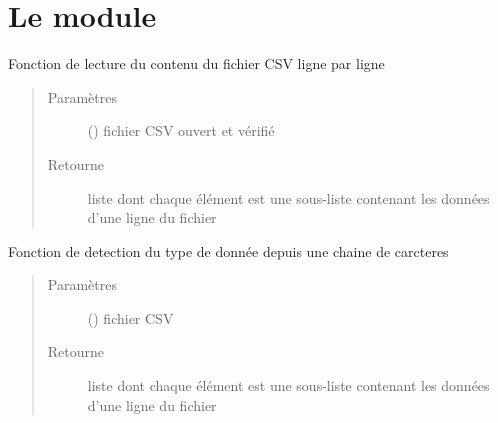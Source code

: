 \documentclass[letterpaper,10pt,french]{sphinxmanual}
\begin{document}
\section{Le module }
\label{\detokenize{analyseContenuFichier:le-module-analyse-contenu-fichier}}

\begin{fulllineitems}
\label{\detokenize{analyseContenuFichier:chargement_des_donnees.analyseContenuFichier.lecture}}
Fonction de lecture du contenu du fichier CSV ligne par ligne
\begin{quote}\begin{description}
\item[{Paramètres}] \leavevmode
{} () \textendash{} fichier CSV ouvert et vérifié

\item[{Retourne}] \leavevmode
liste dont chaque élément est une sous-liste contenant les données d’une ligne du fichier

\end{description}\end{quote}

\end{fulllineitems}


\begin{fulllineitems}
\label{\detokenize{analyseContenuFichier:chargement_des_donnees.analyseContenuFichier.typeDeDonnee}}
Fonction de detection du type de donnée depuis une chaine de carcteres
\begin{quote}\begin{description}
\item[{Paramètres}] \leavevmode
{} () \textendash{} fichier CSV

\item[{Retourne}] \leavevmode
liste dont chaque élément est une sous-liste contenant les données d’une ligne du fichier

\end{description}\end{quote}

\end{fulllineitems}
\end{document}
